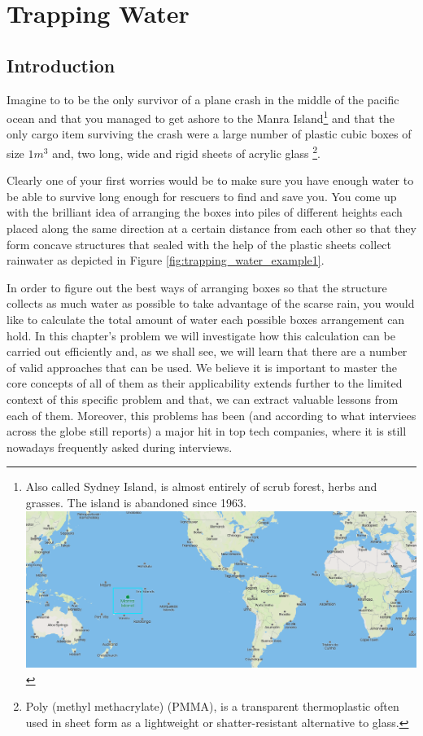%

\chapter{Trapping Water}
\label{ch:trapping_water}
\section*{Introduction}
Imagine to to be the only survivor of a plane crash in the middle of the pacific ocean and that you managed to get ashore to the Manra Island\footnote{Also called Sydney Island, is almost entirely of scrub forest, herbs and grasses. The island is abandoned since 1963. 
\includegraphics[]{sources/trapping_water/images/manra_island}} 
and that the only cargo item surviving the crash were a large number of plastic cubic boxes of size $1m^3$ and, two long, wide and rigid sheets of acrylic glass \footnote{Poly (methyl methacrylate) (PMMA), is a transparent thermoplastic often used in sheet form as a lightweight or shatter-resistant alternative to glass.}.

Clearly one of your first worries would be to make sure you have enough water to be able to survive long enough for rescuers to find and save you.
You come up with the brilliant idea of arranging the boxes into piles of different heights each placed along the same direction  
at a certain distance from each other so that they form concave structures that sealed with the help of the plastic sheets collect rainwater as depicted in Figure \ref{fig:trapping_water_example1}. 

In order to figure out the best ways of arranging boxes so that the structure collects as much water as possible to take advantage of the scarse rain, you would like to calculate the total amount of water each possible boxes arrangement can hold.
In this chapter's problem we will investigate how this calculation can be carried out efficiently and, as we shall see, we will learn that there are a number of valid approaches that can be used.
We believe it is important to master the core concepts of all of them as their applicability extends further to the limited context of this specific problem and that, we can extract valuable lessons from each of them.
Moreover, this problems has been (and according to what interviees across the globe still reports) a major hit in top tech companies, where it is still nowadays frequently asked during interviews.



